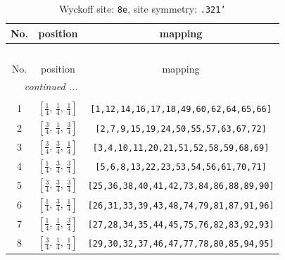 \documentclass[fleqn,8pt]{jsarticle}
\begin{document}
\begin{longtable}{ccc}
\caption{Wyckoff site: {\tt 8e}, site symmetry: {\tt .321'}}
 \\
 \hline \hline
No. & position & mapping \\ \hline \endfirsthead

\multicolumn{2}{l}{\tablename\ \thetable{}} \\
 \hline \hline
No. & position & mapping \\ \hline \endhead

 \hline \hline
\multicolumn{2}{r}{\footnotesize\it continued ...} \\ \endfoot

 \hline \hline
\multicolumn{2}{r}{} \\ \endlastfoot

1 & $\left[ \frac{1}{4},\, \frac{1}{4},\, \frac{1}{4} \right]$ & {\tt [1,12,14,16,17,18,49,60,62,64,65,66]} \\ \hline
2 & $\left[ \frac{3}{4},\, \frac{1}{4},\, \frac{3}{4} \right]$ & {\tt [2,7,9,15,19,24,50,55,57,63,67,72]} \\ \hline
3 & $\left[ \frac{3}{4},\, \frac{3}{4},\, \frac{1}{4} \right]$ & {\tt [3,4,10,11,20,21,51,52,58,59,68,69]} \\ \hline
4 & $\left[ \frac{1}{4},\, \frac{3}{4},\, \frac{3}{4} \right]$ & {\tt [5,6,8,13,22,23,53,54,56,61,70,71]} \\ \hline
5 & $\left[ \frac{3}{4},\, \frac{3}{4},\, \frac{3}{4} \right]$ & {\tt [25,36,38,40,41,42,73,84,86,88,89,90]} \\ \hline
6 & $\left[ \frac{1}{4},\, \frac{3}{4},\, \frac{1}{4} \right]$ & {\tt [26,31,33,39,43,48,74,79,81,87,91,96]} \\ \hline
7 & $\left[ \frac{1}{4},\, \frac{1}{4},\, \frac{3}{4} \right]$ & {\tt [27,28,34,35,44,45,75,76,82,83,92,93]} \\ \hline
8 & $\left[ \frac{3}{4},\, \frac{1}{4},\, \frac{1}{4} \right]$ & {\tt [29,30,32,37,46,47,77,78,80,85,94,95]} \\
\end{longtable}
\renewcommand{\arraystretch}{1.2}
\end{document}

